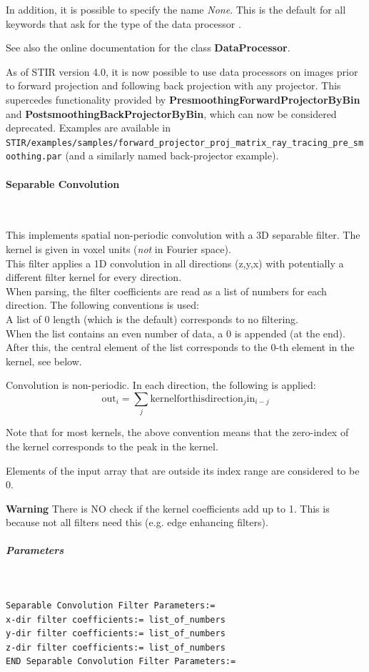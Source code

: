 \documentclass{article}
\newcommand{\tab}{\hspace{5mm}}
\newcommand{\subsubsubsection}[1]{\paragraph{#1}\mbox{} \\}
\newcommand{\subsubsubsubsection}[1]{\subparagraph{#1} \mbox{} \\}
\begin{document}
{{In addition, it is possible to specify the name \textit{None}. This 
is the default for all keywords that ask for the type of 
the data processor .


See also the online documentation for the class \textbf{DataProcessor}.

As of STIR version 4.0, it is now possible to use data processors 
on images prior to forward projection and following back projection
with any projector. This supercedes functionality provided by 
 \textbf{PresmoothingForwardProjectorByBin} and 
 \textbf{PostsmoothingBackProjectorByBin},
  which can now be considered deprecated. Examples are available
in \texttt{STIR/examples/samples/forward\_projector\_proj\_matrix\_ray\_tracing\_pre\_smoothing.par} 
(and a similarly named back-projector example).

{ \subsubsubsection{Separable Convolution}
}
This implements spatial non-periodic convolution with a 3D separable 
filter. The kernel is given in voxel units (\textit{not} in Fourier 
space).\\
This filter applies a 1D convolution in all directions (z,y,x) 
with potentially a different filter kernel for every direction.\\
When parsing, the filter coefficients are read as a list of numbers 
for each direction. The following conventions is used:\\
{\textbullet}\tab 
A list of 0 length (which is the default) corresponds to no filtering.\\
{\textbullet}\tab When the list contains an even number of data, a 0 is 
appended (at the end).\\
{\textbullet}\tab 
After this, the central element of the list corresponds to the 
0-th element in the kernel, see below.


Convolution is non-periodic. In each direction, the following 
is applied: 
\[
\mathrm{out}_i = \sum_{j} \mathrm{kernelforthisdirection}_{j} \mathrm{in}_{i-j}
\]

Note that for most kernels, the above convention means that the 
zero-index of the kernel corresponds to the peak in the kernel. 



Elements of the input array that are outside its index range 
are considered to be 0. 


\textbf{Warning} There is NO check if the kernel coefficients add 
up to 1. This is because not all filters need this (e.g. edge 
enhancing filters).

{ \subsubsubsubsection{Parameters}
}
\begin{verbatim}
Separable Convolution Filter Parameters:=
x-dir filter coefficients:= list_of_numbers
y-dir filter coefficients:= list_of_numbers
z-dir filter coefficients:= list_of_numbers
END Separable Convolution Filter Parameters:=
\end{verbatim}

}}
\end{document}
